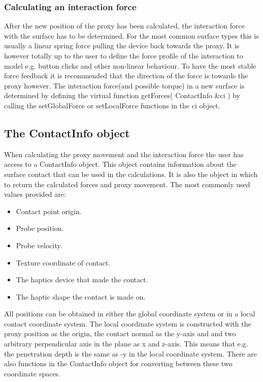 \subsubsection{Calculating an interaction force}
After the new position of the proxy has been calculated, the interaction force with the surface has to be determined. For the most common surface types this is usually a linear spring force pulling the device back towards the proxy. It is however totally up to the user to define the force profile of the interaction to model e.g. button clicks and other non-linear behaviour. To have the most stable force feedback it is recommended that the direction of the force is towards the proxy however.  
The interaction force(and possible torque) in a new surface is determined by defining the virtual function getForces( ContactInfo \&ci ) by calling the setGlobalForce or setLocalForce functions in the ci object. 

\subsection{The ContactInfo object}
When calculating the proxy movement and the interaction force the user has access to a ContactInfo object. This object contains information about the surface contact that can be used in the calculations. It is also the object in which to return the calculated forces and proxy movement. The most commonly used values provided are:

\begin{itemize}
\item Contact point origin.
\item Probe position.
\item Probe velocity.
\item Texture coordinate of contact.
\item The haptics device that made the contact.
\item The haptic shape the contact is made on.
\end{itemize}


All positions can be obtained in either the global coordinate system or
in a local contact coordinate system. The local coordinate system is constructed with the proxy position as the origin, the contact normal as the y-axis and and two arbitrary perpendicular axis in the plane as x and z-axis. This means that e.g. the penetration depth is the same as -y in the local coordinate system. There are also functions in the ContactInfo object for converting between these two coordinate spaces. 

